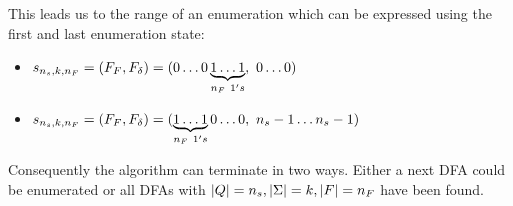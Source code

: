 \noindent This leads us to the range of an enumeration which can be expressed using the first and last enumeration state:
\begin{itemize}
	\item $s_{\nSO, \kAL, \nF} = (F_F, F_\delta) = (0\ldots0\underbrace{1\ldots 1}_{\nF\ 1's},\ 0\ldots0)$
	\item $s_{{n_s}, k, {n_F}} = (F_F, F_\delta) = (\underbrace{1\ldots 1}_{{n_F}\ 1's}0\ldots0,\ {n_s}-1 \ldots {n_s}-1)$
\end{itemize}
Consequently the algorithm can terminate in two ways. Either a next DFA could be enumerated or all DFAs with $|Q|={n_s}, |\Sigma|=k, |F|={n_F}$ have been found.



	

